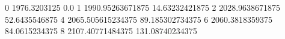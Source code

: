 0 1976.3203125 0.0
1 1990.95263671875 14.63232421875
2 2028.9638671875 52.6435546875
4 2065.505615234375 89.185302734375
6 2060.3818359375 84.0615234375
8 2107.40771484375 131.08740234375
